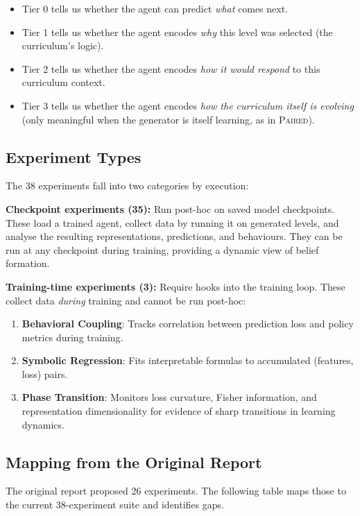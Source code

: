 \documentclass[11pt,a4paper]{article}
\theoremstyle{remark}
\newcommand{\paired}{\textsc{Paired}}
\begin{document}
\begin{itemize}[nosep]
    \item Tier 0 tells us whether the agent can predict \textit{what} comes next.
    \item Tier 1 tells us whether the agent encodes \textit{why} this level was selected (the curriculum's logic).
    \item Tier 2 tells us whether the agent encodes \textit{how it would respond} to this curriculum context.
    \item Tier 3 tells us whether the agent encodes \textit{how the curriculum itself is evolving} (only meaningful when the generator is itself learning, as in \paired{}).
\end{itemize}

\subsection{Experiment Types}

The 38 experiments fall into two categories by execution:

\textbf{Checkpoint experiments (35):} Run post-hoc on saved model checkpoints. These load a trained agent, collect data by running it on generated levels, and analyse the resulting representations, predictions, and behaviours. They can be run at any checkpoint during training, providing a dynamic view of belief formation.

\textbf{Training-time experiments (3):} Require hooks into the training loop. These collect data \textit{during} training and cannot be run post-hoc:
\begin{enumerate}[nosep]
    \item \textbf{Behavioral Coupling}: Tracks correlation between prediction loss and policy metrics during training.
    \item \textbf{Symbolic Regression}: Fits interpretable formulas to accumulated (features, loss) pairs.
    \item \textbf{Phase Transition}: Monitors loss curvature, Fisher information, and representation dimensionality for evidence of sharp transitions in learning dynamics.
\end{enumerate}

\subsection{Mapping from the Original Report}

The original report proposed 26 experiments. The following table maps those to the current 38-experiment suite and identifies gaps.
\end{document}
